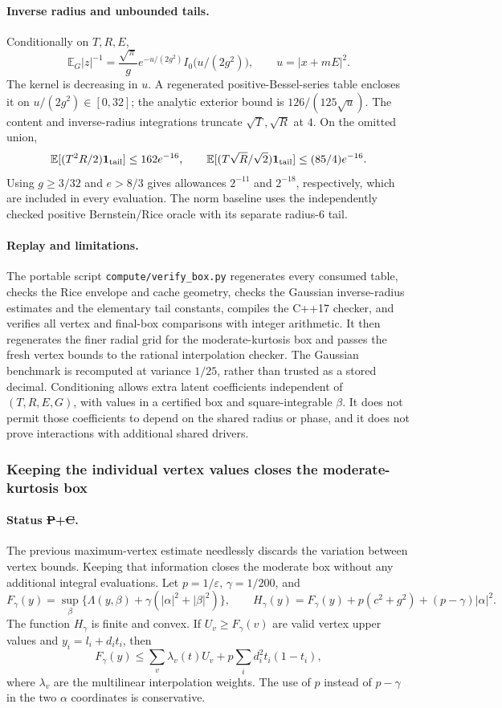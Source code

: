 \paragraph{Inverse radius and unbounded tails.}
Conditionally on $T,R,E$,
\[
 \mathbb E_G|z|^{-1}
 =\frac{\sqrt\pi}{g}e^{-u/(2g^2)}I_0\bigl(u/(2g^2)\bigr),
 \qquad u=|x+mE|^2.
\]
The kernel is decreasing in $u$. A regenerated positive-Bessel-series
table encloses it on $u/(2g^2)\in[0,32]$; the analytic exterior bound is
$126/(125\sqrt u)$. The content and inverse-radius integrations truncate
$\sqrt T,\sqrt R$ at $4$. On the omitted union,
\[
 \mathbb E[(T^2R/2)\mathbf1_{\rm tail}]\le162e^{-16},\qquad
 \mathbb E[(T\sqrt R/\sqrt2)\mathbf1_{\rm tail}]
 \le(85/4)e^{-16}.
\]
Using $g\ge3/32$ and $e>8/3$ gives allowances $2^{-11}$ and $2^{-18}$,
respectively, which are included in every evaluation.
The norm baseline uses the independently checked positive
Bernstein/Rice oracle with its separate radius-$6$ tail.

\paragraph{Replay and limitations.}
The portable script \texttt{compute/verify\_box.py} regenerates every
consumed table, checks the Rice envelope and cache geometry, checks the
Gaussian inverse-radius estimates and the elementary tail constants,
compiles the C++17 checker, and verifies all vertex and final-box
comparisons with integer arithmetic. It then regenerates the finer radial
grid for the moderate-kurtosis box and passes the fresh vertex bounds to
the rational interpolation checker. The Gaussian benchmark is recomputed
at variance $1/25$, rather than trusted as a stored decimal.
Conditioning allows extra latent coefficients independent of
$(T,R,E,G)$, with values in a certified box and square-integrable $\beta$.
It does not permit those coefficients to depend on the shared radius or
phase, and it does not prove interactions with additional shared drivers.


\subsubsection{Keeping the individual vertex values closes the moderate-kurtosis box}
\label{sec:ch37-vertex-refinement}
\paragraph{Status \st{P}+\st{C}.}
The previous maximum-vertex estimate needlessly discards the variation
between vertex bounds. Keeping that information closes the moderate
box without any additional integral evaluations.
Let $p=1/\varepsilon$, $\gamma=1/200$, and
\[
 F_\gamma(y)=\sup_\beta\{\Lambda(y,\beta)
                  +\gamma(|\alpha|^2+|\beta|^2)\},\qquad
 H_\gamma(y)=F_\gamma(y)+p(c^2+g^2)+(p-\gamma)|\alpha|^2.
\]
The function $H_\gamma$ is finite and convex. If $U_v\ge F_\gamma(v)$
are valid vertex upper values and $y_i=l_i+d_it_i$, then
\[
 F_\gamma(y)\le\sum_v\lambda_v(t)U_v
                 +p\sum_i d_i^2t_i(1-t_i),
\]
where $\lambda_v$ are the multilinear interpolation weights.
The use of $p$ instead of $p-\gamma$ in the two $\alpha$ coordinates
is conservative.

